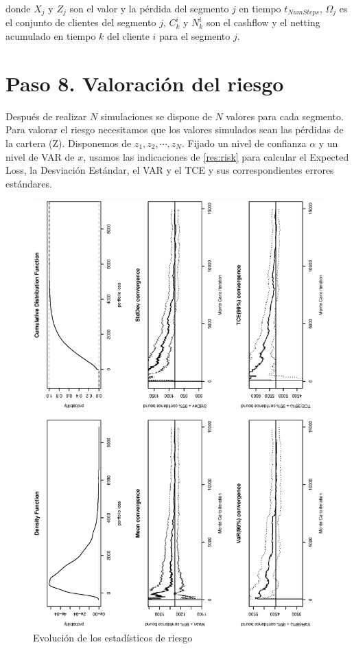 donde $X_j$ y $Z_j$ son el valor y la p\'erdida del segmento $j$ en tiempo $t_{NumSteps}$,
$\Omega_j$ es el conjunto de clientes del segmento $j$, $C_k^i$ y $N_k^i$ son el cashflow
y el netting acumulado en tiempo $k$ del cliente $i$ para el segmento $j$.


\section{Paso 8. Valoraci\'on del riesgo}

Despu\'es de realizar $N$ simulaciones se dispone de $N$ valores para cada
segmento. Para valorar el riesgo necesitamos que los valores simulados sean
las p\'erdidas de la cartera (Z). Disponemos de $z_1, z_2, \cdots, z_N$. Fijado un
nivel de confianza $\alpha$ y un nivel de VAR de $x$, usamos las indicaciones de
\ref{res:risk} para calcular el Expected Loss, la Desviaci\'on Est\'andar, el VAR y
el TCE y sus correspondientes errores est\'andares.

\begin{figure}[!hb]
\begin{center}
\includegraphics[width=12cm,angle=0]{./images/report.eps}
\caption{Evoluci\'on de los estad\'isticos de riesgo}
\label{timetranches}
\end{center}
\end{figure}
